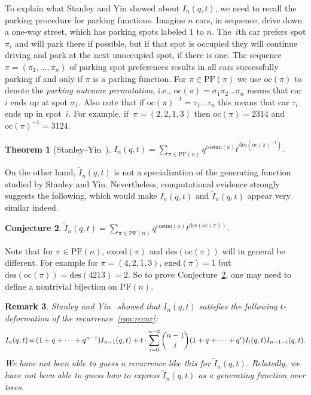 \documentclass[11pt]{amsart}
\newtheorem{thm}{Theorem}
\newtheorem{conj}[thm]{Conjecture}
\newtheorem{Remark}[thm]{Remark}
\newenvironment{remark}
  {\begin{Remark}\rm}{\end{Remark}}
\begin{document}
To explain what Stanley and Yin showed about $I_n(q,t)$, we need to recall the parking procedure for parking functions. Imagine $n$ cars, in sequence, drive down a one-way street, which has parking spots labeled $1$ to $n$. The~$i$th car prefers spot $\pi_i$ and will park there if possible, but if that spot is occupied they will continue driving and park at the next unoccupied spot, if there is one. The sequence $\pi=(\pi_1,\ldots,\pi_n)$ of parking spot preferences results in all cars successfully parking if and only if $\pi$ is a parking function. For $\pi \in \mathrm{PF}(\pi)$ we use $\mathrm{oc}(\pi)$ to denote the \emph{parking outcome permutation}, i.e., $\mathrm{oc}(\pi)=\sigma_1\sigma_2\ldots \sigma_n$ means that car $i$ ends up at spot $\sigma_1$. Also note that if $\mathrm{oc}(\pi)^{-1}=\tau_1\ldots \tau_n$ this means that car $\tau_i$ ends up in spot~$i$. For example, if~$\pi = (2, 2, 1, 3)$ then $\mathrm{oc}(\pi) = 2314$ and $\mathrm{oc}(\pi)^{-1}
= 3124$.

\begin{thm}[Stanley--Yin~\cite{stanley2023enumerative}]
$I_n(q,t) = \sum_{\pi \in \mathrm{PF}(n)}q^{\mathrm{cosum}(a)}t^{\mathrm{des}(\mathrm{oc}(\pi)^{-1})}$.
\end{thm}

On the other hand, $\widetilde{I}_n(q,t)$ is not a specialization of the generating function studied by Stanley and Yin. Nevertheless, computational evidence strongly suggests the following, which would make $I_n(q,t)$ and $\widetilde{I}_n(q,t)$ appear very similar indeed.

\begin{conj} \label{conj:des}
$\widetilde{I}_n(q,t) = \sum_{\pi \in \mathrm{PF}(n)}q^{\mathrm{cosum}(a)}t^{\mathrm{des}(\mathrm{oc}(\pi))}$.
\end{conj}

Note that for $\pi \in \mathrm{PF}(n)$, $\mathrm{exced}(\pi)$ and $\mathrm{des}(\mathrm{oc}(\pi))$ will in general be different. For example for $\pi=(4,2,1,3)$, $\mathrm{exed}(\pi)=1$ but $\mathrm{des}(\mathrm{oc}(\pi))=\mathrm{des}(4213)=2$. So to prove Conjecture~\ref{conj:des}, one may need to define a nontrivial bijection on $\mathrm{PF}(n)$.

\begin{remark}
Stanley and Yin~\cite{stanley2023enumerative} showed that $I_n(q,t)$ satisfies the following $t$-deformation of the recurrence~\eqref{eqn:recur}:
\[I_n(q,t) \hspace{-0.05cm} = \hspace{-0.05cm} (1+q+\cdots+q^{n-1})I_{n-1}(q,t) + t\cdot \sum_{i=0}^{n-2}\binom{n-1}{i}(1+q+\cdots+q^i)I_i(q,t)I_{n-1-i}(q,t).\]
We have not been able to guess a recurrence like this for $\widetilde{I}_n(q,t)$. Relatedly, we have not been able to guess how to express $\widetilde{I}_n(q,t)$ as a generating function over trees.
\end{remark}
\end{document}
